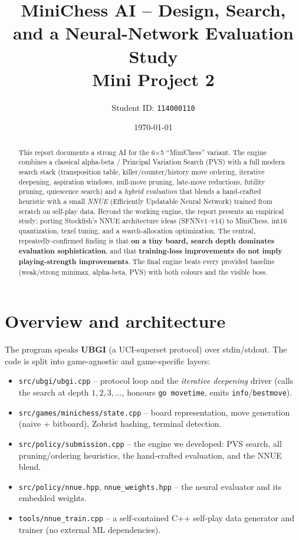 \documentclass[11pt]{article}
\title{\textbf{MiniChess AI -- Design, Search, and a Neural-Network Evaluation Study}\\
\large Mini Project 2}
\author{Student ID: \texttt{114000110}}
\date{\today}
\newcommand{\code}[1]{\texttt{#1}}
\begin{document}
\maketitle

\begin{abstract}
This report documents a strong AI for the 6$\times$5 ``MiniChess'' variant. The
engine combines a classical alpha-beta / Principal Variation Search (PVS) with a
full modern search stack (transposition table, killer/counter/history move
ordering, iterative deepening, aspiration windows, null-move pruning, late-move
reductions, futility pruning, quiescence search) and a \emph{hybrid evaluation}
that blends a hand-crafted heuristic with a small \emph{NNUE} (Efficiently
Updatable Neural Network) trained from scratch on self-play data. Beyond the
working engine, the report presents an empirical study: porting Stockfish's NNUE
architecture ideas (SFNNv1--v14) to MiniChess, int16 quantization, texel tuning,
and a search-allocation optimization. The central, repeatedly-confirmed finding
is that \textbf{on a tiny board, search depth dominates evaluation
sophistication}, and that \textbf{training-loss improvements do not imply
playing-strength improvements}. The final engine beats every provided baseline
(weak/strong minimax, alpha-beta, PVS) with both colours and the visible boss.
\end{abstract}

\tableofcontents

\section{Overview and architecture}
The program speaks \textbf{UBGI} (a UCI-superset protocol) over stdin/stdout.
The code is split into game-agnostic and game-specific layers:

\begin{itemize}[nosep]
  \item \code{src/ubgi/ubgi.cpp} -- protocol loop and the \emph{iterative
        deepening} driver (calls the search at depth $1,2,3,\dots$, honours
        \code{go movetime}, emits \code{info}/\code{bestmove}).
  \item \code{src/games/minichess/state.cpp} -- board representation, move
        generation (naive + bitboard), Zobrist hashing, terminal detection.
  \item \code{src/policy/submission.cpp} -- the engine we developed: PVS search,
        all pruning/ordering heuristics, the hand-crafted evaluation, and the
        NNUE blend.
  \item \code{src/policy/nnue.hpp}, \code{nnue\_weights.hpp} -- the neural
        evaluator and its embedded weights.
  \item \code{tools/nnue\_train.cpp} -- a self-contained C++ self-play data
        generator and trainer (no external ML dependencies).
\end{itemize}
\end{document}
